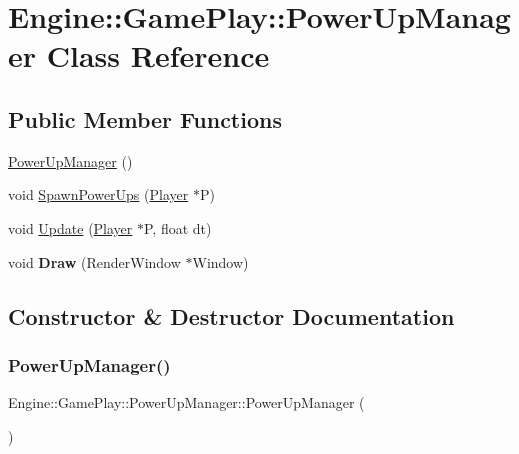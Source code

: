 \hypertarget{class_engine_1_1_game_play_1_1_power_up_manager}{}\section{Engine\+:\+:Game\+Play\+:\+:Power\+Up\+Manager Class Reference}
\label{class_engine_1_1_game_play_1_1_power_up_manager}
\subsection*{Public Member Functions}
\begin{DoxyCompactItemize}
\item 
\hyperlink{class_engine_1_1_game_play_1_1_power_up_manager_a459ae4b757b4f4c5e3dff626460639cd}{Power\+Up\+Manager} ()
\item 
void \hyperlink{class_engine_1_1_game_play_1_1_power_up_manager_ae4b516c8145507da7d326ff7fa5fb2d5}{Spawn\+Power\+Ups} (\hyperlink{class_engine_1_1_game_play_1_1_player}{Player} $\ast$P)
\item 
void \hyperlink{class_engine_1_1_game_play_1_1_power_up_manager_a1a14fd48c2687e5e3fe3df6c7415dad8}{Update} (\hyperlink{class_engine_1_1_game_play_1_1_player}{Player} $\ast$P, float dt)
\item 
\mbox{\label{class_engine_1_1_game_play_1_1_power_up_manager_a8b8a5889b0787f1ae303cb24b3d84481}} 
void {\bfseries Draw} (Render\+Window $\ast$Window)
\end{DoxyCompactItemize}


\subsection{Constructor \& Destructor Documentation}
\mbox{\label{class_engine_1_1_game_play_1_1_power_up_manager_a459ae4b757b4f4c5e3dff626460639cd}} 
\subsubsection{\texorpdfstring{Power\+Up\+Manager()}{PowerUpManager()}}
{\footnotesize\ttfamily Engine\+::\+Game\+Play\+::\+Power\+Up\+Manager\+::\+Power\+Up\+Manager (\begin{DoxyParamCaption}{ }\end{DoxyParamCaption})}

